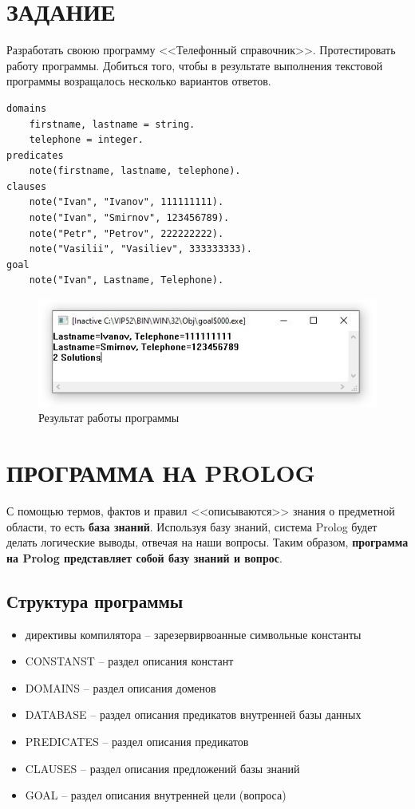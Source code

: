 \section{ЗАДАНИЕ}

Разработать своюю программу <<Телефонный справочник>>. Протестировать работу программы. Добиться того, чтобы в результате выполнения текстовой программы возращалось несколько вариантов ответов.

\begin{lstlisting}[caption=Текст программы]
domains
	firstname, lastname = string.
	telephone = integer.
predicates
	note(firstname, lastname, telephone).
clauses
	note("Ivan", "Ivanov", 111111111).
	note("Ivan", "Smirnov", 123456789).
	note("Petr", "Petrov", 222222222).
	note("Vasilii", "Vasiliev", 333333333).
goal
	note("Ivan", Lastname, Telephone).
\end{lstlisting}

\begin{figure}[H]
    \centering
    \includegraphics{img/result.jpg}
    \caption{Результат работы программы}
\end{figure}

\section{ПРОГРАММА НА PROLOG}

С помощью термов, фактов и правил <<описываются>> знания о предметной области, то есть \textbf{база знаний}. Используя базу знаний, система Prolog будет делать логические выводы, отвечая на наши вопросы. Таким образом, \textbf{программа на Prolog представляет собой базу знаний и вопрос}.

\subsection{Структура программы}

\begin{itemize}
    \item директивы компилятора -- зарезервирвоанные символьные константы
    \item CONSTANST -- раздел описания констант
    \item DOMAINS -- раздел описания доменов
    \item DATABASE -- раздел описания предикатов внутренней базы данных
    \item PREDICATES -- раздел описания предикатов
    \item CLAUSES -- раздел описания предложений базы знаний
    \item GOAL -- раздел описания внутренней цели (вопроса)
\end{itemize}

